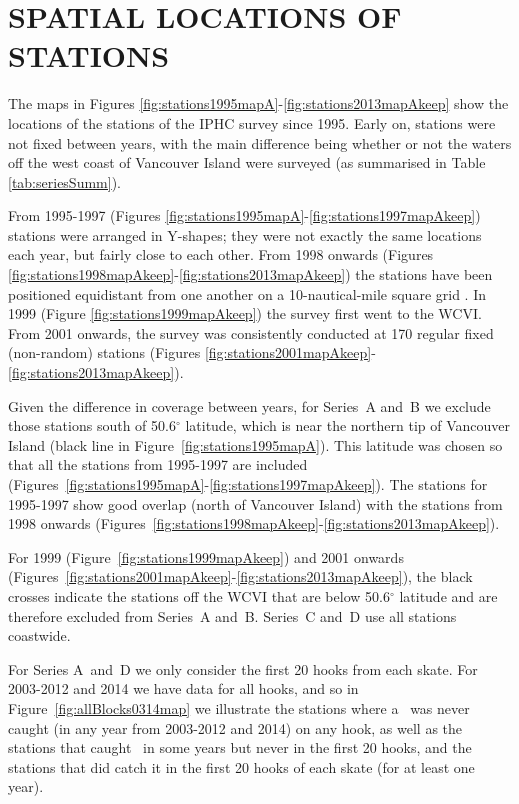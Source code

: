 


\section{SPATIAL LOCATIONS OF STATIONS}

The maps in Figures \ref{fig:stations1995mapA}-\ref{fig:stations2013mapAkeep}
show the locations of the stations of the IPHC survey since 1995. Early on,
stations were not fixed between years, with the main difference being whether or
not the waters off the west coast of Vancouver Island were surveyed (as
summarised in Table \ref{tab:seriesSumm}).

From 1995-1997 (Figures
\ref{fig:stations1995mapA}-\ref{fig:stations1997mapAkeep}) stations were
arranged in Y-shapes; they were not exactly the same locations each year, but
fairly close to each other. From 1998 onwards (Figures
\ref{fig:stations1998mapAkeep}-\ref{fig:stations2013mapAkeep}) the stations have
been positioned equidistant from one another on a 10-nautical-mile square grid
\citep{fycd12}. In 1999 (Figure \ref{fig:stations1999mapAkeep}) the survey first
went to the WCVI. From 2001 onwards, the survey was consistently conducted at
170 regular fixed (non-random) stations (Figures
\ref{fig:stations2001mapAkeep}-\ref{fig:stations2013mapAkeep}).

Given the difference in coverage between years, for Series~A and~B we exclude
those stations south of 50.6$^{\circ}$ latitude, which is near the northern tip
of Vancouver Island (black line in Figure~\ref{fig:stations1995mapA}). This
latitude was chosen so that all the stations from 1995-1997 are included
(Figures~\ref{fig:stations1995mapA}-\ref{fig:stations1997mapAkeep}). The
stations for 1995-1997 show good overlap (north of Vancouver Island) with the
stations from 1998 onwards
(Figures~\ref{fig:stations1998mapAkeep}-\ref{fig:stations2013mapAkeep}).

For 1999 (Figure~\ref{fig:stations1999mapAkeep}) and 2001 onwards
(Figures~\ref{fig:stations2001mapAkeep}-\ref{fig:stations2013mapAkeep}), the
black crosses indicate the stations off the WCVI that are below 50.6$^{\circ}$
latitude and are therefore excluded from Series~A and~B. Series~C and~D use all
stations coastwide.

For Series A~and~D we only consider the first 20 hooks from each skate. For
2003-2012 and 2014 we have data for all hooks, and so in
Figure~\ref{fig:allBlocks0314map} we illustrate the stations where a \spName~was
never caught (in any year from 2003-2012 and 2014) on any hook, as well as the
stations that caught \spName~in some years but never in the first 20 hooks, and
the stations that did catch it in the first 20 hooks of each skate (for at least
one year).

